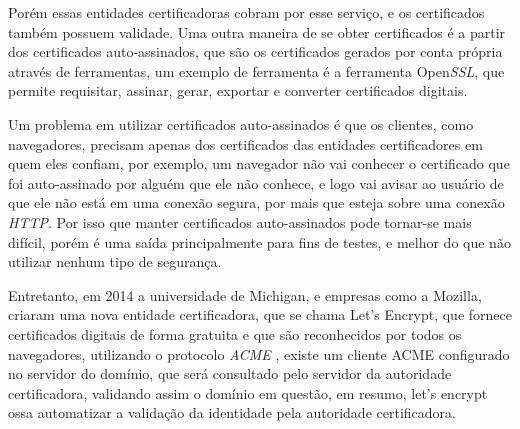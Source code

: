 Porém essas entidades certificadoras cobram por esse serviço, e os certificados também
possuem validade. Uma outra maneira de se obter certificados é a partir dos certificados
auto-assinados, que são os certificados gerados por conta própria através de
ferramentas, um exemplo de ferramenta é a ferramenta Open\textit{SSL}, que permite requisitar,
assinar, gerar, exportar e converter certificados digitais.

Um problema em utilizar certificados auto-assinados é que os clientes, como navegadores,
precisam apenas dos certificados das entidades certificadores em quem eles confiam, por
exemplo, um navegador não vai conhecer o certificado que foi auto-assinado por
alguém que ele não conhece, e logo vai avisar ao usuário de que ele não está em uma
conexão segura, por mais que esteja sobre uma conexão \textit{HTTP}. Por isso que manter certificados
auto-assinados pode tornar-se mais difícil, porém é uma saída principalmente para
fins de testes, e melhor do que não utilizar nenhum tipo de segurança.

Entretanto, em 2014 a universidade de Michigan, e empresas como a Mozilla, criaram
uma nova entidade certificadora, que se chama Let's Encrypt, que fornece certificados
digitais de forma gratuita e que são reconhecidos por todos os navegadores,
utilizando o protocolo \textit{ACME}  \cite{ACME}, existe um cliente ACME configurado no
servidor do domínio, que será
consultado pelo servidor da autoridade certificadora, validando assim o domínio
em questão, em resumo, let's encrypt
ossa automatizar a validação da identidade pela autoridade certificadora.
